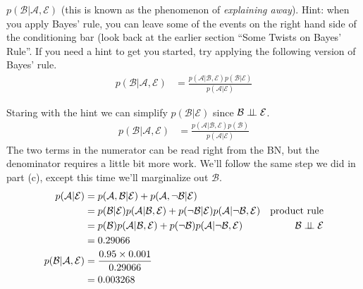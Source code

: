\documentclass[assignment02_Solutions]{subfiles}
\begin{document}
\begin{exercise}[(60 minutes)]
\item $p(\mathcal{B} | \mathcal{A}, \mathcal{E})$ (this is known as the phenomenon of \emph{explaining away}).  Hint: when you apply Bayes' rule, you can leave some of the events on the right hand side of the conditioning bar (look back at the earlier section ``Some Twists on Bayes' Rule''.  If you need a hint to get you started, try applying the following version of Bayes' rule.
\begin{align}
p(\mathcal{B} | \mathcal{A}, \mathcal{E}) &= \frac{p(\mathcal{A} | \mathcal{B}, \mathcal{E}) p(\mathcal{B} | \mathcal{E})}{p(\mathcal{A} | \mathcal{E})} \nonumber
\end{align}


\begin{boxedsolution}
Staring with the hint we can simplify $p(\mathcal{B} | \mathcal{E})$ since $\mathcal{B} \perp\!\!\!\perp \mathcal{E}$.
\begin{align}
p(\mathcal{B} | \mathcal{A}, \mathcal{E}) &= \frac{p(\mathcal{A} | \mathcal{B}, \mathcal{E}) p(\mathcal{B})}{p(\mathcal{A} | \mathcal{E})} \nonumber
\end{align}
The two terms in the numerator can be read right from the BN, but the denominator requires a little bit more work.  We'll follow the same step we did in part (c), except this time we'll marginalize out $\mathcal{B}$.
\begin{align}
p(\mathcal{A} | \mathcal{E}) &= p(\mathcal{A}, \mathcal{B} | \mathcal{E}) + p(\mathcal{A}, \neg \mathcal{B} | \mathcal{E}) \nonumber \\
&= p(\mathcal{B} | \mathcal{E}) p(\mathcal{A} | \mathcal{B}, \mathcal{E}) + p(\neg \mathcal{B} | \mathcal{E}) p(\mathcal{A} | \neg \mathcal{B}, \mathcal{E}) & \mbox{product rule}\nonumber \\
&=  p(\mathcal{B}) p(\mathcal{A} | \mathcal{B}, \mathcal{E}) + p(\neg \mathcal{B}) p(\mathcal{A} | \neg \mathcal{B}, \mathcal{E})  & \mathcal{B} \perp\!\!\!\perp \mathcal{E} \nonumber \\
&= 0.29066 \nonumber \\
p(\mathcal{B} | \mathcal{A}, \mathcal{E}) &= \frac{0.95 \times 0.001}{0.29066} \nonumber \\
&= 0.003268 \nonumber
\end{align}

\end{boxedsolution}

\ees
\end{exercise}
\end{document}
